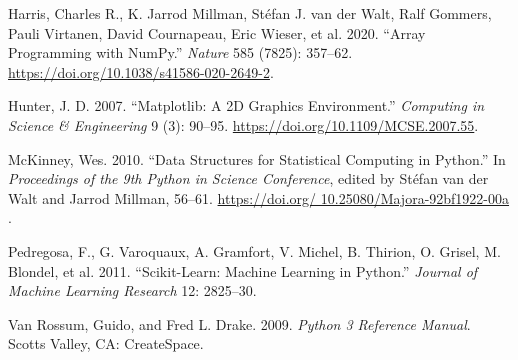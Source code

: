\documentclass[
  letterpaper,
  DIV=11,
  numbers=noendperiod]{scrartcl}
\newlength{\cslhangindent}
\newenvironment{CSLReferences}[2] %
 {\begin{list}{}{%
  \setlength{\itemindent}{0pt}
  \setlength{\leftmargin}{0pt}
  \setlength{\parsep}{0pt}
  \ifodd #1
   \setlength{\leftmargin}{\cslhangindent}
   \setlength{\itemindent}{-1\cslhangindent}
  \fi
  \setlength{\itemsep}{#2\baselineskip}}}
 {\end{list}}
\begin{document}
\label{refs}
\begin{CSLReferences}{1}{0}
Harris, Charles R., K. Jarrod Millman, Stéfan J. van der Walt, Ralf
Gommers, Pauli Virtanen, David Cournapeau, Eric Wieser, et al. 2020.
{``Array Programming with {NumPy}.''} \emph{Nature} 585 (7825): 357--62.
\url{https://doi.org/10.1038/s41586-020-2649-2}.

Hunter, J. D. 2007. {``Matplotlib: A 2D Graphics Environment.''}
\emph{Computing in Science \& Engineering} 9 (3): 90--95.
\url{https://doi.org/10.1109/MCSE.2007.55}.

McKinney, Wes. 2010. {``{D}ata {S}tructures for {S}tatistical
{C}omputing in {P}ython.''} In \emph{{P}roceedings of the 9th {P}ython
in {S}cience {C}onference}, edited by Stéfan van der Walt and Jarrod
Millman, 56--61.
\href{https://doi.org/\%2010.25080/Majora-92bf1922-00a\%20}{https://doi.org/
10.25080/Majora-92bf1922-00a }.

Pedregosa, F., G. Varoquaux, A. Gramfort, V. Michel, B. Thirion, O.
Grisel, M. Blondel, et al. 2011. {``Scikit-Learn: Machine Learning in
{P}ython.''} \emph{Journal of Machine Learning Research} 12: 2825--30.

Van Rossum, Guido, and Fred L. Drake. 2009. \emph{Python 3 Reference
Manual}. Scotts Valley, CA: CreateSpace.

\end{CSLReferences}
\end{document}
